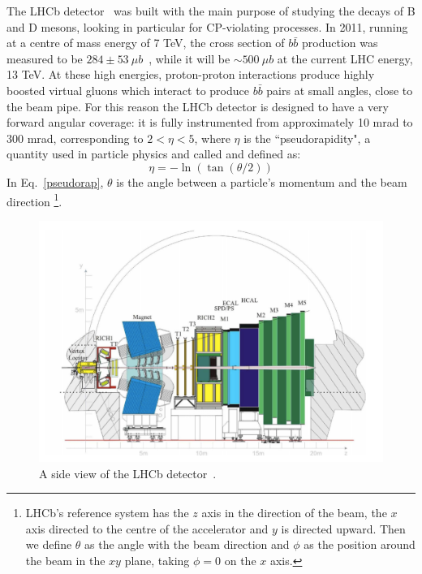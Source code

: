 The LHCb detector~\cite{Alves:2008zz} was built with the main purpose of studying the decays of B and D mesons, looking in particular for
CP-violating processes. In 2011, running at a centre of mass energy of 7 TeV, the cross section of $b\bar{b}$ production
was measured to be $284 \pm 53 ~\mu b$~\cite{Aaij:2010gn}, while it will be $\sim500 ~\mu b$ at the current LHC energy, 13 TeV.
At these high energies, proton-proton interactions produce highly boosted virtual gluons which interact to produce $b\bar{b}$
pairs at small angles, close to the beam pipe. For this reason the LHCb detector is designed to have a very forward angular
coverage: it is fully instrumented from approximately 10 mrad to 300 mrad, corresponding to $2 < \eta < 5$, where $\eta$
is the ``pseudorapidity", a quantity used in particle physics and called and defined as:
\begin{equation}
\label{pseudorap}
\eta = - \ln(\tan(\theta/2))
\end{equation}
In Eq.~\ref{pseudorap}, $\theta$ is the angle between a particle's momentum and the beam direction
\footnote{LHCb's reference system has the $z$ axis in the direction of the beam, the $x$ axis directed to
the centre of the accelerator and $y$ is directed upward. Then we define $\theta$ as the angle with the beam
direction and $\phi$ as the position around the beam in the $xy$ plane, taking $\phi = 0$ on the $x$ axis.}.

\begin{figure}[h]
\includegraphics[width=1.\linewidth]{Detector/figs/LHCb_official.png}
\caption{A side view of the LHCb detector~\cite{Alves:2008zz}.}
\label{fig:lhcb}
\end{figure}

